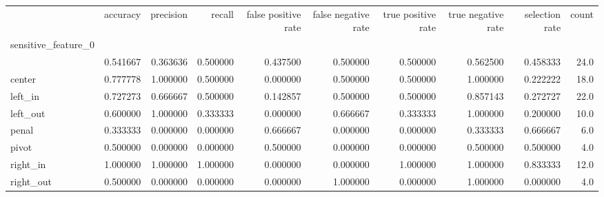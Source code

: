 \begin{tabular}{lrrrrrrrrr}
\toprule
{} &  accuracy &  precision &    recall &  false positive rate &  false negative rate &  true positive rate &  true negative rate &  selection rate &  count \\
sensitive\_feature\_0 &           &            &           &                      &                      &                     &                     &                 &        \\
\midrule
                    &  0.541667 &   0.363636 &  0.500000 &             0.437500 &             0.500000 &            0.500000 &            0.562500 &        0.458333 &   24.0 \\
center              &  0.777778 &   1.000000 &  0.500000 &             0.000000 &             0.500000 &            0.500000 &            1.000000 &        0.222222 &   18.0 \\
left\_in             &  0.727273 &   0.666667 &  0.500000 &             0.142857 &             0.500000 &            0.500000 &            0.857143 &        0.272727 &   22.0 \\
left\_out            &  0.600000 &   1.000000 &  0.333333 &             0.000000 &             0.666667 &            0.333333 &            1.000000 &        0.200000 &   10.0 \\
penal               &  0.333333 &   0.000000 &  0.000000 &             0.666667 &             0.000000 &            0.000000 &            0.333333 &        0.666667 &    6.0 \\
pivot               &  0.500000 &   0.000000 &  0.000000 &             0.500000 &             0.000000 &            0.000000 &            0.500000 &        0.500000 &    4.0 \\
right\_in            &  1.000000 &   1.000000 &  1.000000 &             0.000000 &             0.000000 &            1.000000 &            1.000000 &        0.833333 &   12.0 \\
right\_out           &  0.500000 &   0.000000 &  0.000000 &             0.000000 &             1.000000 &            0.000000 &            1.000000 &        0.000000 &    4.0 \\
\bottomrule
\end{tabular}
